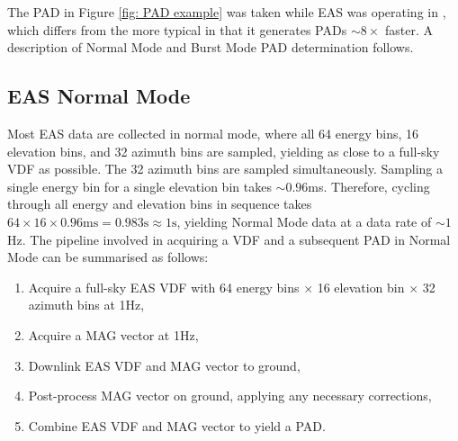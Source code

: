 The PAD in Figure \ref{fig: PAD example} was taken while EAS was operating in , which differs from the more typical  in that it generates PADs \(\sim8\times\) faster. A description of Normal Mode and Burst Mode PAD determination follows.



\subsection{EAS Normal Mode} \label{EAS Normal Mode}

Most EAS data are collected in normal mode, where all 64 energy bins, 16 elevation bins, and 32 azimuth bins are sampled, yielding as close to a full-sky VDF as possible. The 32 azimuth bins are sampled simultaneously. Sampling a single energy bin for a single elevation bin takes \(\sim0.96\)ms\cite{owen2021}. Therefore, cycling through all energy and elevation bins in sequence takes \(64\times16\times0.96\textrm{ms}=0.983\textrm{s}\approx1\textrm{s}\), yielding Normal Mode data at a data rate of \(\sim1\)Hz\cite{owen2021}. The pipeline involved in acquiring a VDF and a subsequent PAD in Normal Mode can be summarised as follows\cite{owen2020}:

\begin{enumerate}
    \item Acquire a full-sky EAS VDF with 64 energy bins \(\times\) 16 elevation bin \(\times\) 32 azimuth bins at 1Hz,
    \item Acquire a MAG vector at 1Hz,
    \item Downlink EAS VDF and MAG vector to ground,
    \item Post-process MAG vector on ground, applying any necessary corrections,
    \item Combine EAS VDF and MAG vector to yield a PAD.
\end{enumerate}

